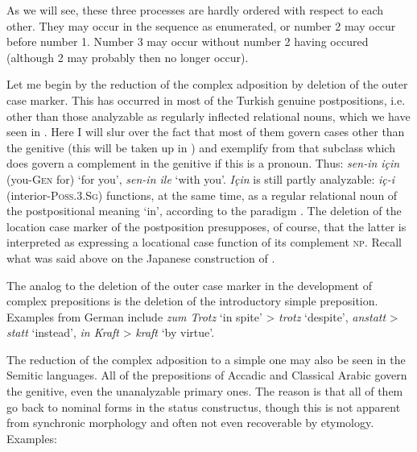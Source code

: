 As we will see, these three processes are hardly ordered with respect to each other. They may occur in the sequence as enumerated, or number 2 may occur before number 1. Number 3 may occur without number 2 having occured (although 2 may probably then no longer occur).

\label{page86}Let me begin by the reduction of the complex adposition by deletion of the outer case marker. This has occurred in most of the Turkish genuine postpositions, i.e. other than those analyzable as regularly inflected relational nouns, which we have seen in . Here I will slur over the fact that most of them govern cases other than the genitive (this will be taken up in ) and exemplify from that subclass which does govern a complement in the genitive if this is a pronoun. Thus: \textit{sen-in için} (you-\textsc{Gen} for) ‘for you’, \textit{sen-in ile} ‘with you’. \textit{Için} is still partly analyzable: \textit{iç-i} (interior-\textsc{Poss.3.Sg}) functions, at the same time, as a regular relational noun of the postpositional meaning ‘in’, according to the paradigm . The deletion of the location case marker of the postposition presupposes, of course, that the latter is interpreted as expressing a locational case function of its complement \textsc{np}. Recall what was said above on the Japanese construction of .

The analog to the deletion of the outer case marker in the development of complex prepositions is the deletion of the introductory simple preposition. Examples from German include \textit{zum Trotz}%
 ‘in spite’ {\textgreater} \textit{trotz} ‘despite’, \textit{anstatt} {\textgreater} \textit{statt} ‘instead’, \textit{in Kraft} {\textgreater} \textit{kraft} ‘by virtue’.

The reduction of the complex adposition to a simple one may also be seen in the Semitic languages. All of the prepositions of Accadic and Classical Arabic govern the genitive, even the unanalyzable primary ones. The reason is that all of them go back to nominal forms in the status constructus, though this is not apparent from synchronic morphology and often not even recoverable by etymology. Examples:

